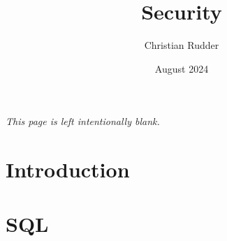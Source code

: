 \documentclass{article}
\title{Security}
\author{Christian Rudder}
\date{August 2024}
\begin{document}
\maketitle

\tableofcontents

\newpage
\thispagestyle{empty}
\mbox{}
\vfill
\begin{center}
    \textit{This page is left intentionally blank.}
\end{center}
\vfill
\newpage

\section{Introduction}


\section{SQL}

\end{document}
